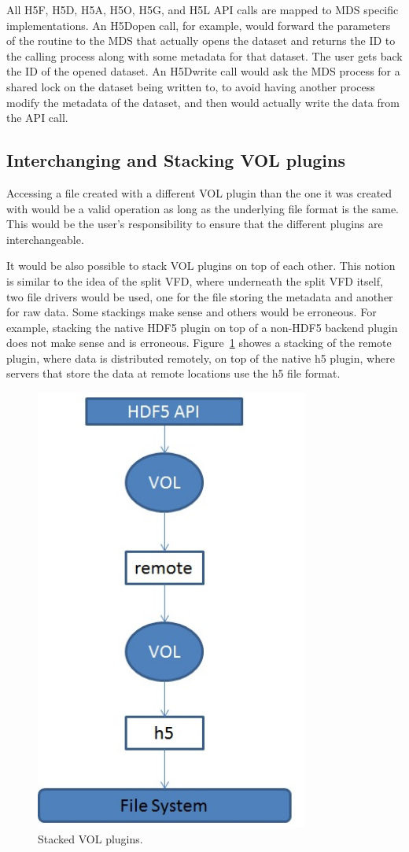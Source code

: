 \documentclass[letterpaper,hyper]{THG_RFC}
\begin{document}
All H5F, H5D, H5A, H5O, H5G, and H5L API calls are mapped to MDS specific implementations. An H5Dopen call, for example, would forward the parameters of the routine to the MDS that actually opens the dataset and returns the ID to the calling process along with some metadata for that dataset. The user gets back the ID of the opened dataset. An H5Dwrite call would ask the MDS process for a shared lock on the dataset being written to, to avoid having another process modify the metadata of the dataset, and then would actually write the data from the API call.
\clearpage
\subsection{Interchanging and Stacking VOL plugins}
Accessing a file created with a different VOL plugin than the one it was created with would be a valid operation as long as the underlying file format is the same. This would be the user’s responsibility to ensure that the different plugins are interchangeable. 

It would be also possible to stack VOL plugins on top of each other. This notion is similar to the idea of the split VFD, where underneath the split VFD itself, two file drivers would be used, one for the file storing the metadata and another for raw data. Some stackings make sense and others would be erroneous. For example, stacking the native HDF5 plugin on top of a non-HDF5 backend plugin does not make sense and is erroneous. Figure~\ref{fig:stack} showes a stacking of the remote plugin, where data is distributed remotely, on top of the native h5 plugin, where servers that store the data at remote locations use the h5 file format.

\begin{figure}[h!]
\centering
\includegraphics[width=90mm]{stacked.jpg}
\caption{Stacked VOL plugins.}
\label{fig:stack}
\end{figure}
\end{document}
